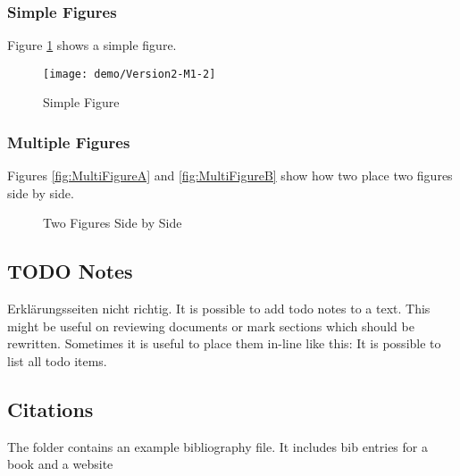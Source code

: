 \subsubsection{Simple Figures}
%
Figure \ref{fig:SimpleFigure} shows a simple figure.
%
\begin{figure}[htb]
	\begin{center}
		\texttt{[image: demo/Version2-M1-2]}
		\caption{Simple Figure}
		\label{fig:SimpleFigure}
	\end{center}
\end{figure}
%
%
\subsubsection{Multiple Figures}
%
Figures \ref{fig:MultiFigureA} and \ref{fig:MultiFigureB} show how two place 
two figures side by side.
%
\begin{figure}[htb]
	\begin{center}
		\caption{Two Figures Side by Side}
	\end{center}
\end{figure}
%
\subsection{TODO Notes}
%
Erklärungsseiten nicht richtig.
It is possible to add todo notes to a text.
This might be useful on reviewing documents or mark sections
which should be rewritten.
Sometimes it is useful to place them in-line like this:
%
It is possible to list all todo items.
\listoftodos
%
\subsection{Citations}
%
The  folder contains an example bibliography file.
It includes bib entries for a book\cite{LatexBook} and
a website\cite{LatexWebsite}
%
